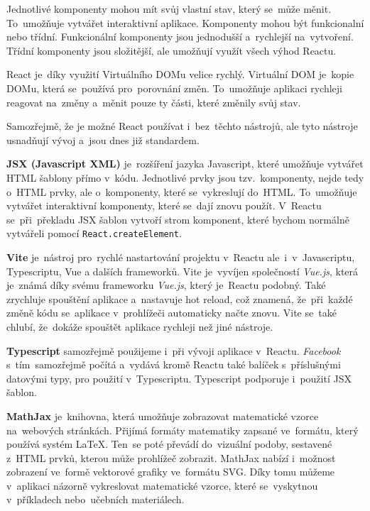 \documentclass[14pt]{article}
\begin{document}
            Jednotlivé komponenty mohou mít svůj vlastní stav, který se~může měnit. To~umožňuje vytvářet interaktivní aplikace.
            Komponenty mohou být funkcionalní nebo třídní. Funkcionální komponenty jsou jednodušší a~rychlejší na~vytvoření.
            Třídní komponenty jsou složitější, ale umožňují využít všech výhod Reactu.

            React je~díky využití Virtuálního DOMu velice rychlý. Virtuální DOM je~kopie DOMu, která se~používá pro~porovnání změn.
            To~umožňuje aplikaci rychleji reagovat na~změny a~měnit pouze ty části, které změnily svůj stav.

            Samozřejmě, že je možné React používat i~bez~těchto nástrojů, ale tyto nástroje usnadňují vývoj a~jsou dnes již standardem. \parencite{elrom2021react}
            
            \textbf{JSX (Javascript XML)} je~rozšíření jazyka Javascript, které umožňuje vytvářet HTML šablony přímo v~kódu. Jednotlivé prvky jsou tzv.~komponenty,
            nejde tedy o~HTML prvky, ale o~komponenty, které se~vykreslují do~HTML. To~umožňuje vytvářet interaktivní komponenty, které se~dají znovu použít.
            V~Reactu se~při~překladu JSX šablon vytvoří strom komponent, které bychom normálně vytvářeli pomocí \texttt{React.createElement}.

            \textbf{Vite} je~nástroj pro~rychlé nastartování projektu v~Reactu ale~i~v~Javascriptu, Typescriptu, Vue a dalších frameworků.
            Vite je~vyvíjen společností \emph{Vue.js}, která je~známá díky svému frameworku \emph{Vue.js}, který je~Reactu podobný.
            Také zrychluje spouštění aplikace a~nastavuje hot reload, což znamená, že~při~každé změně kódu se~aplikace v~prohlížeči automaticky načte znovu.
            Vite se~také chlubí, že~dokáže spouštět aplikace rychleji než jiné nástroje.\parencite{vitejs}

            \textbf{Typescript} samozřejmě použijeme i~při vývoji aplikace v~Reactu. \emph{Facebook} s~tím~samozřejmě počítá a~vydává
            kromě Reactu také balíček s~příslušnými datovými typy, pro použití v~Typescriptu. Typescript podporuje i~použití JSX šablon. \parencite[Refeerence/Handbook/JSX]{TypeScript}

            \textbf{MathJax} je~knihovna, která umožňuje zobrazovat matematické vzorce na~webových stránkách.
            Přijímá formáty matematiky zapsané ve~formátu, který používá systém \LaTeX. Ten~se poté převádí do~vizuální podoby, sestavené z~HTML prvků, kterou může prohlížeč zobrazit.
            MathJax nabízí i~možnost zobrazení ve~formě vektorové grafiky ve~formátu SVG.
            Díky tomu můžeme v~aplikaci názorně vykreslovat matematické vzorce, které se~vyskytnou v~příkladech nebo~učebních materiálech.
\end{document}
